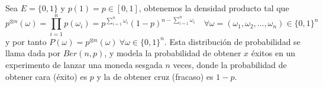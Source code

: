 \begin{ejemplo}
    Sea $E=\{0,1\}$ y $p(1)=p\in[0,1]$, obtenemos la densidad producto tal que
    \begin{equation*}
        p^{\otimes n}(\omega) = \prod_{i=1}^n p(\omega_i) = p^{\sum\limits_{i=1}^n \omega_i} (1-p)^{n - \sum\limits_{i=1}^n \omega_i} \quad \forall \omega=(\omega_1, \omega_2, \ldots, \omega_n) \in \{0,1\}^n
    \end{equation*}
    y por tanto $P(\omega) = p^{\otimes n}(\omega) \ \forall \omega\in \{0,1\}^n$. Esta distribución de probabilidad se llama  dada por $Ber(n,p)$, y modela la probabilidad de obtener $x$ éxitos en un experimento de lanzar una moneda sesgada $n$ veces, donde la probabilidad de obtener cara (éxito) es $p$ y la de obtener cruz (fracaso) es $1-p$.
\end{ejemplo}

